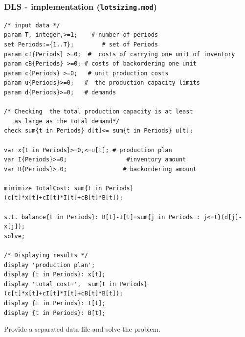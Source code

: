 \documentclass[landscape]{beamer}
\begin{document}
\begin{frame}[fragile]
  \frametitle{DLS - implementation (\texttt{lotsizing.mod})}
  \vspace{-0.8cm}
\begin{tiny}
\begin{verbatim}
/* input data */
param T, integer,>=1;    # number of periods 
set Periods:={1..T};        # set of Periods 
param cI{Periods} >=0;  #  costs of carrying one unit of inventory 
param cB{Periods} >=0; # costs of backordering one unit 
param c{Periods} >=0;   # unit production costs
param u{Periods}>=0;   #  the production capacity limits
param d{Periods}>=0;   # demands  

/* Checking  the total production capacity is at least
   as large as the total demand*/ 
check sum{t in Periods} d[t]<= sum{t in Periods} u[t];

var x{t in Periods}>=0,<=u[t]; # production plan
var I{Periods}>=0;                 #inventory amount 
var B{Periods}>=0;                # backordering amount

minimize TotalCost: sum{t in Periods} (c[t]*x[t]+cI[t]*I[t]+cB[t]*B[t]);

s.t. balance{t in Periods}: B[t]-I[t]=sum{j in Periods : j<=t}(d[j]-x[j]);
solve;

/* Displaying results */
display 'production plan';
display {t in Periods}: x[t];
display 'total cost=',  sum{t in Periods} (c[t]*x[t]+cI[t]*I[t]+cB[t]*B[t]);
display {t in Periods}: I[t];
display {t in Periods}: B[t];
\end{verbatim}
\end{tiny}
\vspace{-0.5cm}
\begin{small}
 Provide a separated data file and solve the problem.
\end{small}
\end{frame}
\end{document}
